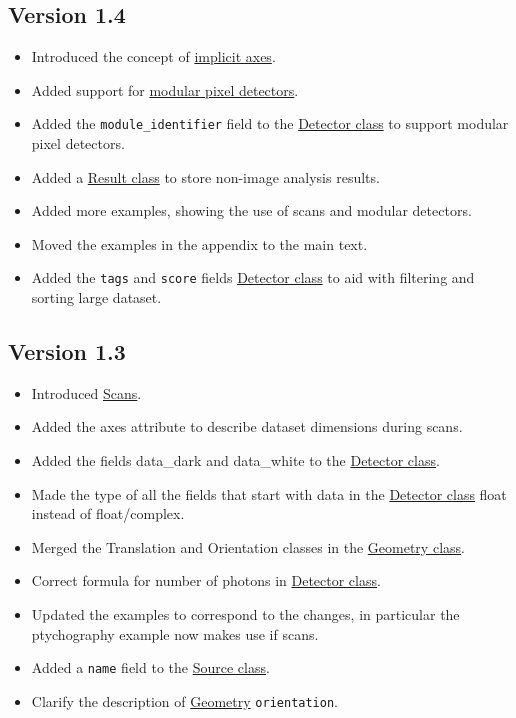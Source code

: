 \documentclass[usletter,11pt]{article}
\begin{document}
\subsection{Version 1.4}
\begin{itemize}
\item{Introduced the concept of \hyperref[sec:scans]{implicit axes}. }
\item{Added support for \hyperref[subsec:modularDetectors]{modular pixel
    detectors}.}
\item{Added the {\tt module\_identifier} field to the
  \hyperref[table:detector]{Detector class} to support modular pixel detectors.}
\item{Added a \hyperref[table:result]{Result class} to store non-image analysis
  results.}
\item{Added more examples, showing the use of scans and modular detectors.}
\item{Moved the examples in the appendix to the main text.}
\item{Added the {\tt tags} and {\tt score} fields \hyperref[table:detector]{Detector class} 
  to aid with filtering and sorting large dataset.}
\end{itemize}
\subsection{Version 1.3}
\begin{itemize}
\item{Introduced \hyperref[sec:scans]{Scans}.}
\item{Added the axes attribute to describe dataset dimensions during
    scans.}
\item{Added the fields data\_dark and data\_white to the
   \hyperref[table:detector]{Detector class}.}
\item{Made the type of all the fields that start with data in the
   \hyperref[table:detector]{Detector class} float instead of
   float/complex.}
\item{Merged the Translation and Orientation classes in the
    \hyperref[table:geometry]{Geometry class}.}
\item{Correct formula for number of photons in
    \hyperref[table:detector]{Detector class}.}
\item{Updated the examples to correspond to the changes, in particular
   the ptychography example now makes use if scans.}
\item{Added a {\tt name} field to the
   \hyperref[table:source]{Source class}.}
\item{Clarify the description of \hyperref[table:geometry]{Geometry}
    {\tt orientation}.}
\end{itemize}
\end{document}
